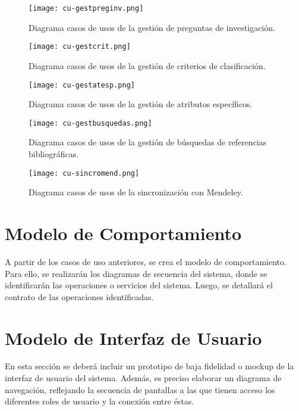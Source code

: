 \begin{figure}[h!]
	\begin{center}
		\texttt{[image: cu-gestpreginv.png]}
		\caption{Diagrama casos de usos de la gestión de preguntas de investigación.}
		\label{fig:cu04}
	\end{center}
\end{figure}

\begin{figure}[h!]
	\begin{center}
		\texttt{[image: cu-gestcrit.png]}
		\caption{Diagrama casos de usos de la gestión de criterios de clasificación.}
		\label{fig:cu05}
	\end{center}
\end{figure}

\begin{figure}[h!]
	\begin{center}
		\texttt{[image: cu-gestatesp.png]}
		\caption{Diagrama casos de usos de la gestión de atributos específicos.}
		\label{fig:cu06}
	\end{center}
\end{figure}

\begin{figure}[h!]
	\begin{center}
		\texttt{[image: cu-gestbusquedas.png]}
		\caption{Diagrama casos de usos de la gestión de búsquedas de referencias bibliográficas.}
		\label{fig:cu07}
	\end{center}
\end{figure}

\begin{figure}[h!]
	\begin{center}
		\texttt{[image: cu-sincromend.png]}
		\caption{Diagrama casos de usos de la sincronización con Mendeley.}
		\label{fig:cu08}
	\end{center}
\end{figure}


\section{Modelo de Comportamiento}
A partir de los casos de uso anteriores, se crea el modelo de comportamiento. Para ello, se realizarán los diagramas de secuencia del sistema, donde se identificarán las operaciones o servicios del sistema. Luego, se detallará el contrato de las operaciones identificadas.

\section{Modelo de Interfaz de Usuario}
En esta sección se deberá incluir un prototipo de baja fidelidad o mockup de la interfaz de usuario del sistema. Además, es preciso elaborar un diagrama de navegación, reflejando la secuencia de pantallas a las que tienen acceso los diferentes roles de usuario y la conexión entre éstas.